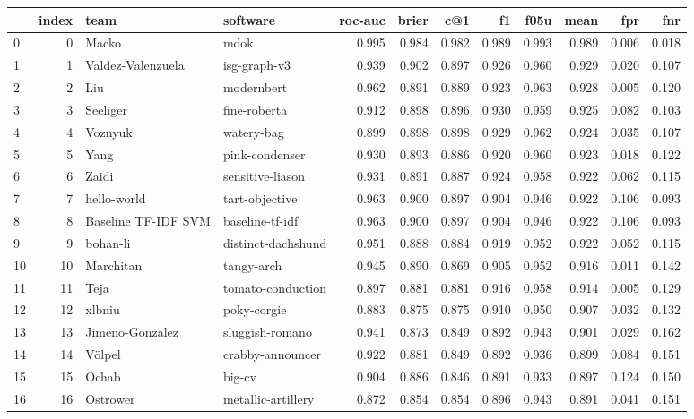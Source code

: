 \begin{tabular}{lrllrrrrrrrr}
\toprule
 & index & team & software & roc-auc & brier & c@1 & f1 & f05u & mean & fpr & fnr \\
\midrule
0 & 0 & Macko & mdok & 0.995 & 0.984 & 0.982 & 0.989 & 0.993 & 0.989 & 0.006 & 0.018 \\
1 & 1 & Valdez-Valenzuela & isg-graph-v3 & 0.939 & 0.902 & 0.897 & 0.926 & 0.960 & 0.929 & 0.020 & 0.107 \\
2 & 2 & Liu & modernbert & 0.962 & 0.891 & 0.889 & 0.923 & 0.963 & 0.928 & 0.005 & 0.120 \\
3 & 3 & Seeliger & fine-roberta & 0.912 & 0.898 & 0.896 & 0.930 & 0.959 & 0.925 & 0.082 & 0.103 \\
4 & 4 & Voznyuk & watery-bag & 0.899 & 0.898 & 0.898 & 0.929 & 0.962 & 0.924 & 0.035 & 0.107 \\
5 & 5 & Yang & pink-condenser & 0.930 & 0.893 & 0.886 & 0.920 & 0.960 & 0.923 & 0.018 & 0.122 \\
6 & 6 & Zaidi & sensitive-liason & 0.931 & 0.891 & 0.887 & 0.924 & 0.958 & 0.922 & 0.062 & 0.115 \\
7 & 7 & hello-world & tart-objective & 0.963 & 0.900 & 0.897 & 0.904 & 0.946 & 0.922 & 0.106 & 0.093 \\
8 & 8 & Baseline TF-IDF SVM & baseline-tf-idf & 0.963 & 0.900 & 0.897 & 0.904 & 0.946 & 0.922 & 0.106 & 0.093 \\
9 & 9 & bohan-li & distinct-dachshund & 0.951 & 0.888 & 0.884 & 0.919 & 0.952 & 0.922 & 0.052 & 0.115 \\
10 & 10 & Marchitan & tangy-arch & 0.945 & 0.890 & 0.869 & 0.905 & 0.952 & 0.916 & 0.011 & 0.142 \\
11 & 11 & Teja & tomato-conduction & 0.897 & 0.881 & 0.881 & 0.916 & 0.958 & 0.914 & 0.005 & 0.129 \\
12 & 12 & xlbniu & poky-corgie & 0.883 & 0.875 & 0.875 & 0.910 & 0.950 & 0.907 & 0.032 & 0.132 \\
13 & 13 & Jimeno-Gonzalez & sluggish-romano & 0.941 & 0.873 & 0.849 & 0.892 & 0.943 & 0.901 & 0.029 & 0.162 \\
14 & 14 & Völpel & crabby-announcer & 0.922 & 0.881 & 0.849 & 0.892 & 0.936 & 0.899 & 0.084 & 0.151 \\
15 & 15 & Ochab & big-cv & 0.904 & 0.886 & 0.846 & 0.891 & 0.933 & 0.897 & 0.124 & 0.150 \\
16 & 16 & Ostrower & metallic-artillery & 0.872 & 0.854 & 0.854 & 0.896 & 0.943 & 0.891 & 0.041 & 0.151 \\

\end{tabular}
